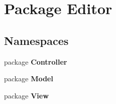 \section{Package Editor}
\label{namespace_editor}
\subsection*{Namespaces}
\begin{DoxyCompactItemize}
\item 
package {\bf Controller}
\item 
package {\bf Model}
\item 
package {\bf View}
\end{DoxyCompactItemize}
